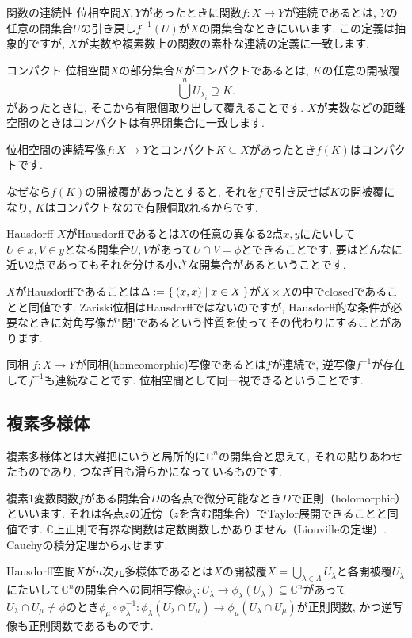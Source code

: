 \documentclass{jsarticle}
\newcommand{\CC}{\mathbb{C}}
\theoremstyle{definition}
\newcommand{\mydescription}[1]{
\begin{description}
\setlength{\itemindent}{2zw}
\setlength{\leftskip}{-2zw}
\setlength{\labelsep}{1zw}
#1
\end{description}
}
\numberwithin{theorem}{section}
\begin{document}
\mydescription{
\item[関数の連続性] 位相空間$X, Y$があったときに関数$f: X \rightarrow Y$が連続であるとは, $Y$の任意の開集合$U$の引き戻し$f^{-1}(U)$が$X$の開集合なときにいいます.
この定義は抽象的ですが, $X$が実数や複素数上の関数の素朴な連続の定義に一致します.

\item[コンパクト] 位相空間$X$の部分集合$K$がコンパクトであるとは, $K$の任意の開被覆
\[
\bigcup^n U_{\lambda_i} \supseteq K.
\]
があったときに, そこから有限個取り出して覆えることです.
$X$が実数などの距離空間のときはコンパクトは有界閉集合に一致します.

位相空間の連続写像$f: X \rightarrow Y$とコンパクト$K\subseteq X$があったとき$f(K)$はコンパクトです.

なぜなら$f(K)$の開被覆があったとすると, それを$f$で引き戻せば$K$の開被覆になり, $K$はコンパクトなので有限個取れるからです.

\item[Hausdorff] $X$がHausdorffであるとは$X$の任意の異なる2点$x, y$にたいして$U \in x, V \in y$となる開集合$U, V$があって$U \cap V = \phi$とできることです. 要はどんなに近い2点であってもそれを分ける小さな開集合があるということです.

$X$がHausdorffであることは$\Delta := \Set{(x, x) | x \in X}$が$X \times X$の中でclosedであることと同値です. Zariski位相はHausdorffではないのですが, Hausdorff的な条件が必要なときに対角写像が"閉"であるという性質を使ってその代わりにすることがあります.

\item[同相] $f: X \rightarrow Y$が同相(homeomorphic)写像であるとは$f$が連続で, 逆写像$f^{-1}$が存在して$f^{-1}$も連続なことです. 位相空間として同一視できるということです.
}

\subsection{複素多様体}
複素多様体とは大雑把にいうと局所的に$\CC^n$の開集合と思えて, それの貼りあわせたものであり, つなぎ目も滑らかになっているものです.

複素1変数関数$f$がある開集合$D$の各点で微分可能なとき$D$で正則（holomorphic）といいます. それは各点$z$の近傍（$z$を含む開集合）でTaylor展開できることと同値です. $\CC$上正則で有界な関数は定数関数しかありません（Liouvilleの定理）. Cauchyの積分定理から示せます.

 Hausdorff空間$X$が$n$次元多様体であるとは$X$の開被覆$X = \bigcup_{\lambda \in \Lambda} U_\lambda$と各開被覆$U_\lambda$にたいして$\CC^n$の開集合への同相写像$\phi_\lambda : U_\lambda \rightarrow \phi_\lambda(U_\lambda) \subseteq \CC^n$があって$U_\lambda \cap U_\mu \neq \phi$のとき$\phi_\mu\circ\phi_\lambda^{-1} : \phi_\lambda(U_\lambda\cap U_\mu) \rightarrow \phi_\mu(U_\lambda\cap U_\mu)$が正則関数, かつ逆写像も正則関数であるものです.
\end{document}
